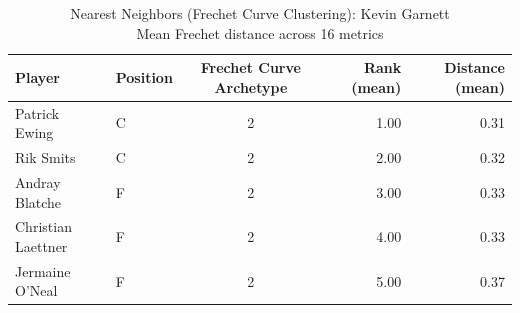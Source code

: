 \begin{table}[t]
\caption*{
{\fontsize{20}{25} Nearest Neighbors (Frechet Curve Clustering): Kevin Garnett\fontsize{12}{15}\selectfont } \\ 
{\fontsize{14}{17}\selectfont  Mean Frechet distance across 16 metrics\fontsize{12}{15}\selectfont }
} 
\fontsize{12.0pt}{14.0pt}\selectfont
\begin{tabular*}{\linewidth}{@{\extracolsep{\fill}}llcrr}
\toprule
Player & Position & Frechet Curve Archetype & Rank (mean) & Distance (mean) \\ 
\midrule\addlinespace[2.5pt]
Patrick Ewing & C & 2 & 1.00 & 0.31 \\ 
Rik Smits & C & 2 & 2.00 & 0.32 \\ 
Andray Blatche & F & 2 & 3.00 & 0.33 \\ 
Christian Laettner & F & 2 & 4.00 & 0.33 \\ 
Jermaine O'Neal & F & 2 & 5.00 & 0.37 \\ 
\bottomrule
\end{tabular*}
\end{table}

